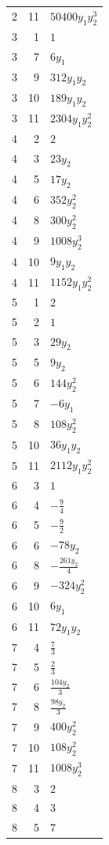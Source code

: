 \documentclass[10pt,a4paper]{article}
\begin{document}
{\begin{longtable}{rrp{125mm}}
2 & 11 & $50400 y_{1} y_{2}^{3}$\\
3 & 1 & $1$\\
3 & 7 & $6 y_{1}$\\
3 & 9 & $312 y_{1} y_{2}$\\
3 & 10 & $189 y_{1} y_{2}$\\
3 & 11 & $2304 y_{1} y_{2}^{2}$\\
4 & 2 & $2$\\
4 & 3 & $23 y_{2}$\\
4 & 5 & $17 y_{2}$\\
4 & 6 & $352 y_{2}^{2}$\\
4 & 8 & $300 y_{2}^{2}$\\
4 & 9 & $1008 y_{2}^{3}$\\
4 & 10 & $9 y_{1} y_{2}$\\
4 & 11 & $1152 y_{1} y_{2}^{2}$\\
5 & 1 & $2$\\
5 & 2 & $1$\\
5 & 3 & $29 y_{2}$\\
5 & 5 & $9 y_{2}$\\
5 & 6 & $144 y_{2}^{2}$\\
5 & 7 & $- 6 y_{1}$\\
5 & 8 & $108 y_{2}^{2}$\\
5 & 10 & $36 y_{1} y_{2}$\\
5 & 11 & $2112 y_{1} y_{2}^{2}$\\
6 & 3 & $1$\\
6 & 4 & $- \frac{9}{4}$\\
6 & 5 & $- \frac{9}{2}$\\
6 & 6 & $- 78 y_{2}$\\
6 & 8 & $- \frac{261 y_{2}}{4}$\\
6 & 9 & $- 324 y_{2}^{2}$\\
6 & 10 & $6 y_{1}$\\
6 & 11 & $72 y_{1} y_{2}$\\
7 & 4 & $\frac{7}{3}$\\
7 & 5 & $\frac{2}{3}$\\
7 & 6 & $\frac{104 y_{2}}{3}$\\
7 & 8 & $\frac{98 y_{2}}{3}$\\
7 & 9 & $400 y_{2}^{2}$\\
7 & 10 & $108 y_{2}^{2}$\\
7 & 11 & $1008 y_{2}^{3}$\\
8 & 3 & $2$\\
8 & 4 & $3$\\
8 & 5 & $7$\\

\end{longtable}}
\end{document}
